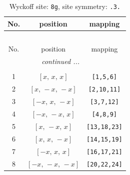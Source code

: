 \documentclass[fleqn,8pt]{jsarticle}
\begin{document}
\renewcommand{\arraystretch}{1.2}
\begin{longtable}{ccc}
\caption{Wyckoff site: {\tt 8g}, site symmetry: {\tt .3.}}
 \\
 \hline \hline
No. & position & mapping \\ \hline \endfirsthead

\multicolumn{2}{l}{\tablename\ \thetable{}} \\
 \hline \hline
No. & position & mapping \\ \hline \endhead

 \hline \hline
\multicolumn{2}{r}{\footnotesize\it continued ...} \\ \endfoot

 \hline \hline
\multicolumn{2}{r}{} \\ \endlastfoot

1 & $\left[ x,\, x,\, x \right]$ & {\tt [1,5,6]} \\ \hline
2 & $\left[ x,\, - x,\, - x \right]$ & {\tt [2,10,11]} \\ \hline
3 & $\left[ - x,\, x,\, - x \right]$ & {\tt [3,7,12]} \\ \hline
4 & $\left[ - x,\, - x,\, x \right]$ & {\tt [4,8,9]} \\ \hline
5 & $\left[ x,\, - x,\, x \right]$ & {\tt [13,18,23]} \\ \hline
6 & $\left[ x,\, x,\, - x \right]$ & {\tt [14,15,19]} \\ \hline
7 & $\left[ - x,\, x,\, x \right]$ & {\tt [16,17,21]} \\ \hline
8 & $\left[ - x,\, - x,\, - x \right]$ & {\tt [20,22,24]} \\
\end{longtable}
\renewcommand{\arraystretch}{1.2}
\end{document}

